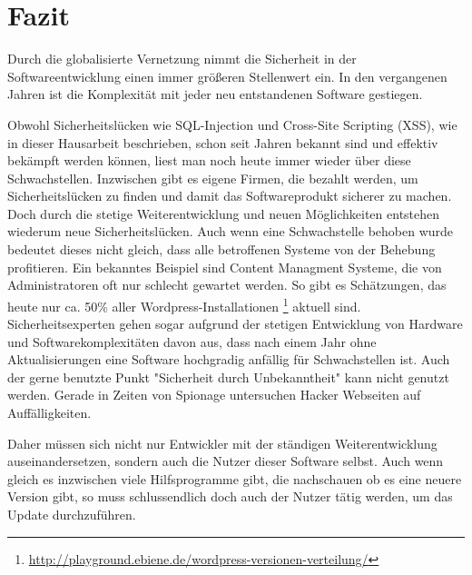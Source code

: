 \section{Fazit}
Durch die globalisierte Vernetzung nimmt die Sicherheit in der 
Softwareentwicklung einen immer größeren Stellenwert ein. In den 
vergangenen Jahren ist die Komplexität mit jeder neu entstandenen 
Software gestiegen. 
\newline


Obwohl Sicherheitslücken wie SQL-Injection und Cross-Site Scripting (XSS), 
wie in dieser Hausarbeit beschrieben, schon seit Jahren bekannt sind und 
effektiv bekämpft werden können, liest man noch heute immer wieder über diese 
Schwachstellen. Inzwischen gibt es eigene Firmen, die bezahlt werden, um 
Sicherheitslücken zu finden und damit das Softwareprodukt sicherer zu 
machen. Doch durch die stetige Weiterentwicklung und neuen Möglichkeiten
entstehen wiederum neue Sicherheitslücken.
Auch wenn eine Schwachstelle behoben wurde bedeutet dieses nicht gleich, 
dass alle betroffenen Systeme von der Behebung profitieren.
Ein bekanntes Beispiel sind Content Managment Systeme, die von
Administratoren oft nur schlecht gewartet werden. So gibt es Schätzungen,
das heute nur ca. 50\% aller Wordpress-Installationen \footnote{\url{http://playground.ebiene.de/wordpress-versionen-verteilung/}}
aktuell sind. Sicherheitsexperten gehen sogar aufgrund der stetigen
Entwicklung von Hardware und Softwarekomplexitäten davon aus, dass 
nach einem Jahr ohne Aktualisierungen eine Software hochgradig
anfällig für Schwachstellen ist.
Auch der gerne benutzte Punkt "Sicherheit durch Unbekanntheit" 
kann nicht genutzt werden. Gerade in Zeiten von Spionage untersuchen
Hacker Webseiten auf Auffälligkeiten.
 
Daher müssen sich nicht nur Entwickler mit der ständigen Weiterentwicklung 
auseinandersetzen, sondern auch die Nutzer dieser Software selbst. 
Auch wenn gleich es inzwischen viele Hilfsprogramme gibt, die nachschauen 
ob es eine neuere Version gibt, so muss schlussendlich doch auch der 
Nutzer tätig werden, um das Update durchzuführen.   
